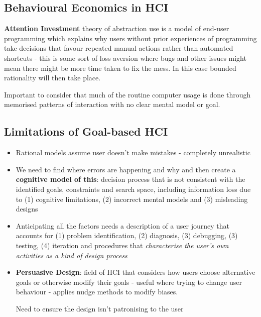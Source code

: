 \documentclass{article}
\newenvironment{cons}{\par\color{red}}{\par}
\begin{document}
\subsection{Behavioural Economics in HCI}
\textbf{Attention Investment} theory of abstraction use is a model of end-user programming which explains why users without prior experiences of programming take decisions that favour repeated manual actions rather than automated shortcuts - this is some sort of loss aversion where bugs and other issues might mean there might be more time taken to fix the mess. In this case bounded rationality will then take place. 

Important to consider that much of the routine computer usage is done through memorised patterns of interaction with no clear mental model or goal.

\subsection{Limitations of Goal-based HCI}
\begin{cons}
\begin{itemize}
    \item Rational models assume user doesn't make mistakes - completely unrealistic
    \item We need to find where errors are happening and why and then create a \textbf{cognitive model of this}: decision process that is not consistent with the identified goals, constraints and search space, including information loss due to (1) cognitive limitations, (2) incorrect mental models and (3) misleading designs
    \item Anticipating all the factors needs a description of a user journey that accounts for (1) problem identification, (2) diagnosis, (3) debugging, (3) testing, (4) iteration and procedures that \textit{characterise the user's own activities as a kind of design process}
    \item \textbf{Persuasive Design}: field of HCI that considers how users choose alternative goals or otherwise modify their goals - useful where trying to change user behaviour - applies nudge methods to modify biases.
    
    Need to ensure the design isn't patronising to the user
\end{itemize}
\end{cons}
\end{document}
